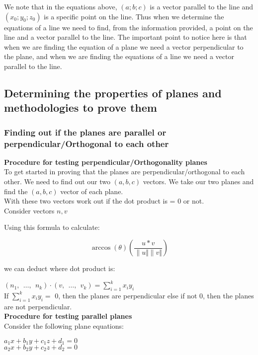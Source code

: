 We note that in the equations above, $(a; b; c)$ is a vector parallel to the line and $(x_0; y_0; z_0)$ is a specific
point on the line.
Thus when we determine the equations of a line we need to find, from the information
provided, a point on the line and a vector parallel to the line.
The important point to notice here is that when we are finding the equation
of a plane we need a vector perpendicular to the plane, and when we are
finding the equations of a line we need a vector parallel to the line.


\subsection{Determining the properties of planes and methodologies to prove them}
\subsubsection{Finding out if the planes are parallel or perpendicular/Orthogonal to each other}
\textbf{Procedure for testing perpendicular/Orthogonality planes}\\
To get started in proving that the planes are perpendicular/orthogonal to each other. We need to find out our two $(a,b,c)$ vectors.
We take our two planes and find the $(a,b,c)$ vector of each plane. \\

With these two vectors work out if the dot product is = 0 or not. \\

Consider vectors $n,v$

Using this formula to calculate:

\begin{equation}
    \arccos{(\theta)}(\frac{u*v}{\| u\Vert \| v\Vert })
\end{equation}

we can deduct where dot product is:

$\left(n_1,\:\:\ldots ,\:\:n_k\right)\cdot \left(v,\:\:\ldots ,\:\:v_k\right)=\sum _{i=1}^kx_iy_i$ \\

If $\sum _{i=1}^kx_iy_i = $ 0, then the planes are perpendicular else if not 0, then the planes are not perpendicular. \\

\textbf{Procedure for testing parallel planes} \\

Consider the following plane equations:
\begin{center}
 $a_1x+b_1y+c_1z+d_1=0$ \\
 $a_2x+b_2y+c_2z+d_2=0$ \\
\end{center}

